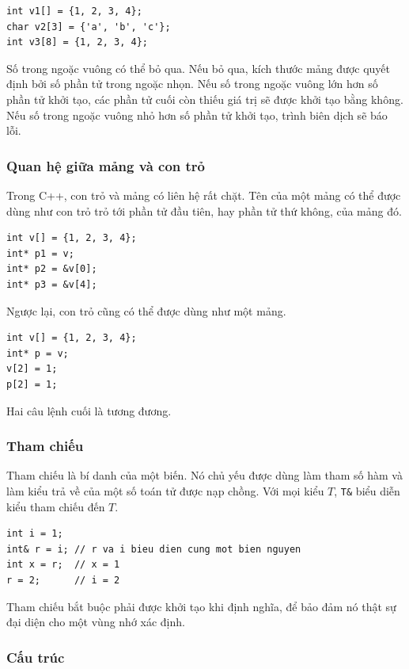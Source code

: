 \documentclass[11pt]{article}
\newcommand{\cpp}{C++}
\begin{document}
\begin{verbatim}
int v1[] = {1, 2, 3, 4};
char v2[3] = {'a', 'b', 'c'};
int v3[8] = {1, 2, 3, 4};
\end{verbatim}

Số trong ngoặc vuông có thể bỏ qua. Nếu bỏ qua, kích thước mảng được quyết
định bởi số phần tử trong ngoặc nhọn. Nếu số trong ngoặc vuông lớn hơn số
phần tử khởi tạo, các phần tử cuối còn thiếu giá trị sẽ được khởi tạo bằng
không. Nếu số trong ngoặc vuông nhỏ hơn số phần tử khởi tạo, trình biên dịch
sẽ báo lỗi.

\subsubsection*{Quan hệ giữa mảng và con trỏ}

Trong \cpp{}, con trỏ và mảng có liên hệ rất chặt. Tên của một mảng có thể
được dùng như con trỏ trỏ tới phần tử đầu tiên, hay phần tử thứ không, của
mảng đó.

\begin{verbatim}
int v[] = {1, 2, 3, 4};
int* p1 = v;
int* p2 = &v[0];
int* p3 = &v[4];
\end{verbatim}

Ngược lại, con trỏ cũng có thể được dùng như một mảng.

\begin{verbatim}
int v[] = {1, 2, 3, 4};
int* p = v;
v[2] = 1;
p[2] = 1;
\end{verbatim}

Hai câu lệnh cuối là tương đương.

\subsubsection*{Tham chiếu}

Tham chiếu là bí danh của một biến. Nó chủ yếu được dùng làm tham số hàm và
làm kiểu trả về của một số toán tử được nạp chồng. Với mọi kiểu \(T\),
\verb|T&| biểu diễn kiểu tham chiếu đến \(T\).

\begin{verbatim}
int i = 1;
int& r = i; // r va i bieu dien cung mot bien nguyen
int x = r;  // x = 1
r = 2;      // i = 2
\end{verbatim}

Tham chiếu bắt buộc phải được khởi tạo khi định nghĩa, để bảo đảm nó thật sự
đại diện cho một vùng nhớ xác định.

\subsubsection*{Cấu trúc}
\end{document}
